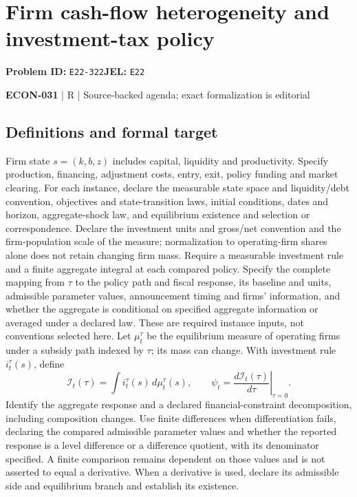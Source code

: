 \documentclass[11pt,a4paper]{article}
\begin{document}
\section*{Firm cash-flow heterogeneity and investment-tax policy}
\textbf{Problem ID:} \texttt{E22-322}\quad \textbf{JEL:} \texttt{E22}\par
\label{problem:OP-0610}


\label{audited:ECON-031}

{\sffamily\small\color{muted}\textbf{ECON-031} | R | Source-backed agenda; exact formalization is editorial\par}

\subsection*{Definitions and formal target}

Firm state \(s=(k,b,z)\) includes capital, liquidity and productivity. Specify production, financing, adjustment costs, entry, exit, policy funding and market clearing. For each instance, declare the measurable state space and liquidity/debt convention, objectives and state-transition laws, initial conditions, dates and horizon, aggregate-shock law, and equilibrium existence and selection or correspondence. Declare the investment units and gross/net convention and the firm-population scale of the measure; normalization to operating-firm shares alone does not retain changing firm mass. Require a measurable investment rule and a finite aggregate integral at each compared policy. Specify the complete mapping from \(\tau\) to the policy path and fiscal response, its baseline and units, admissible parameter values, announcement timing and firms' information, and whether the aggregate is conditional on specified aggregate information or averaged under a declared law. These are required instance inputs, not conventions selected here. Let \(\mu_t^\tau\) be the equilibrium measure of operating firms under a subsidy path indexed by \(\tau\); its mass can change. With investment rule \(i_t^\tau(s)\), define
\[
 \mathcal I_t(\tau)=\int i_t^\tau(s)\,d\mu_t^\tau(s),\qquad
 \psi_t=\left.\frac{d\mathcal I_t(\tau)}{d\tau}\right|_{\tau=0}.
\]
Identify the aggregate response and a declared financial-constraint decomposition, including composition changes. Use finite differences when differentiation fails, declaring the compared admissible parameter values and whether the reported response is a level difference or a difference quotient, with its denominator specified. A finite comparison remains dependent on those values and is not asserted to equal a derivative. When a derivative is used, declare its admissible side and equilibrium branch and establish its existence.
\end{document}
